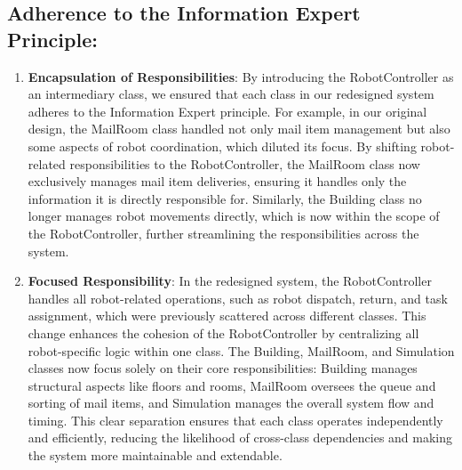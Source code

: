 \documentclass[12pt]{article}
\begin{document}
\subsection{Adherence to the Information Expert Principle:}
\begin{enumerate}
    \item \textbf{Encapsulation of Responsibilities}: By introducing the RobotController as an intermediary class, we ensured that each class in our redesigned system adheres to the Information Expert principle. For example, in our original design, the MailRoom class handled not only mail item management but also some aspects of robot coordination, which diluted its focus. By shifting robot-related responsibilities to the RobotController, the MailRoom class now exclusively manages mail item deliveries, ensuring it handles only the information it is directly responsible for. Similarly, the Building class no longer manages robot movements directly, which is now within the scope of the RobotController, further streamlining the responsibilities across the system.
    \item \textbf{Focused Responsibility}: In the redesigned system, the RobotController handles all robot-related operations, such as robot dispatch, return, and task assignment, which were previously scattered across different classes. This change enhances the cohesion of the RobotController by centralizing all robot-specific logic within one class. The Building, MailRoom, and Simulation classes now focus solely on their core responsibilities: Building manages structural aspects like floors and rooms, MailRoom oversees the queue and sorting of mail items, and Simulation manages the overall system flow and timing. This clear separation ensures that each class operates independently and efficiently, reducing the likelihood of cross-class dependencies and making the system more maintainable and extendable.
\end{enumerate}
\end{document}
